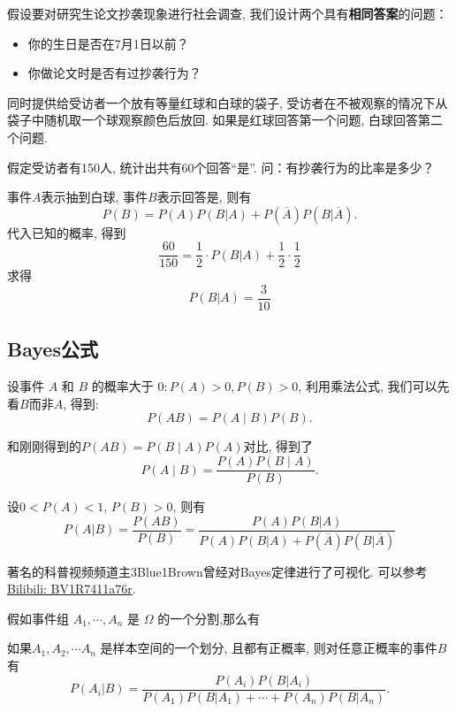 \begin{example}
    假设要对研究生论文抄袭现象进行社会调查, 我们设计两个具有\textbf{相同答案}的问题：
    \begin{itemize}
        \item 你的生日是否在7月1日以前？
        \item 你做论文时是否有过抄袭行为？
    \end{itemize}
    同时提供给受访者一个放有等量红球和白球的袋子, 
    受访者在不被观察的情况下从袋子中随机取一个球观察颜色后放回. 
    如果是红球回答第一个问题, 白球回答第二个问题. 

    假定受访者有150人, 统计出共有60个回答``是''. 问：有抄袭行为的比率是多少？
\end{example}

\begin{solution}
    事件$A$表示抽到白球, 事件$B$表示回答是, 则有
    $$P(B)=P(A)P(B|A)+P(\overline{A})P(B|\overline{A}).$$
    代入已知的概率, 得到
    $$\frac{60}{150}=\frac12\cdot P(B|A)+\frac12\cdot\frac12 $$
    求得
    $$P(B|A)=\frac{3}{10}$$
\end{solution}

\subsection{Bayes公式}
设事件 $A$ 和 $B$ 的概率大于 $0: P(A)>0, P(B)>0$, 利用乘法公式, 我们可以先看$B$而非$A$, 得到: 
$$P(A B)=P(A \mid B) P(B).$$

和刚刚得到的$P(A B)=P(B \mid A) P(A)$对比, 得到了$$P(A \mid B)=\frac{P(A) P(B \mid A)}{P(B)}.$$

\begin{theorem}
    设$0<P(A)<1$, $P(B)>0$, 则有
    $$P(A|B)=\frac{ P(AB)}{ P(B)}
        =\frac{P(A) P(B|A)}{P(A) P(B|A)+P(\overline{A})P(B|\overline{A})}$$
\end{theorem}

\begin{webaside}
    著名的科普视频频道主3Blue1Brown曾经对Bayes定律进行了可视化. 可以参考\href{https://www.bilibili.com/video/BV1R7411a76r}{Bilibili: BV1R7411a76r}.
\end{webaside}
假如事件组 $A_1, \cdots, A_n$ 是 $\Omega$ 的一个分割,那么有

\begin{corollary}
    如果$A_1, A_2, \cdots A_n$ 是样本空间的一个划分, 且都有正概率, 则对任意正概率的事件$B$有
    \[
        P(A_i|B)=\frac{P(A_i)P(B|A_i)}{P(A_1)P(B|A_1)+\cdots+P(A_n)P(B|A_n)}.%
    \]
\end{corollary}

